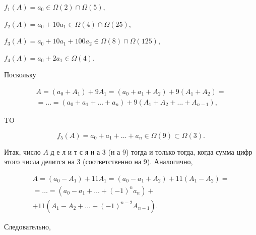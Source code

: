 \documentclass[10pt]{article}
\begin{document}
$f_{1}(A)=a_{0} \in \Omega(2) \cap \Omega(5)$,



$f_{2}(A)=a_{0}+10 a_{1} \in \Omega(4) \cap \Omega(25)$,



$f_{3}(A)=a_{0}+10 a_{1}+100 a_{2} \in \Omega(8) \cap \Omega(125)$,



$f_{4}(A)=a_{0}+2 a_{1} \in \Omega(4)$.



Поскольку



\[

\begin{gathered}

A=\left(a_{0}+A_{1}\right)+9 A_{1}=\left(a_{0}+a_{1}+A_{2}\right)+9\left(A_{1}+A_{2}\right)= \\

=\ldots=\left(a_{0}+a_{1}+\ldots+a_{n}\right)+9\left(A_{1}+A_{2}+\ldots+A_{n-1}\right),

\end{gathered}

\]



TO



\[

f_{5}(A)=a_{0}+a_{1}+\ldots+a_{n} \in \Omega(9) \subset \Omega(3) .

\]



Итак, число $A$ д е л и т с я н а 3 (н а 9) тогда и только тогда, когда сумма цифр этого числа делится на 3 (соответственно на 9). Аналогично,



\[

\begin{gathered}

A=\left(a_{0}-A_{1}\right)+11 A_{1}=\left(a_{0}-a_{1}+A_{2}\right)+11\left(A_{1}-A_{2}\right)= \\

=\ldots=\left(a_{0}-a_{1}+\ldots+(-1)^{n} a_{n}\right)+ \\

+11\left(A_{1}-A_{2}+\ldots+(-1)^{n-2} A_{n-1}\right) .

\end{gathered}

\]



Следовательно,
\end{document}
